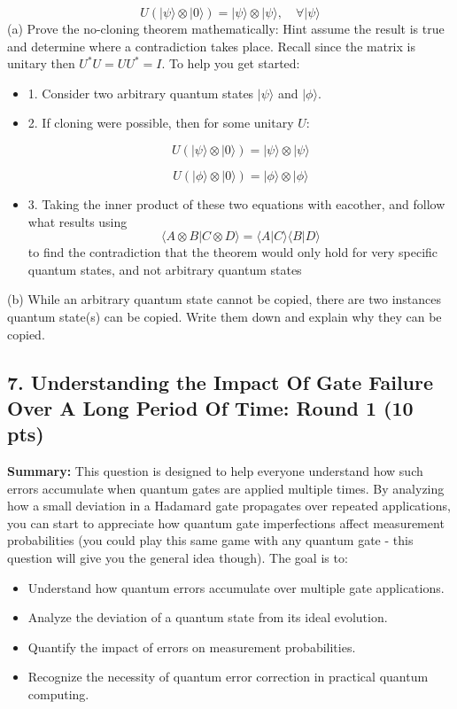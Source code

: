 \documentclass[12pt]{article}
\begin{document}
\[
U (|\psi\rangle \otimes |0\rangle) = |\psi\rangle \otimes |\psi\rangle, \quad \forall |\psi\rangle
\]
(a) Prove the no-cloning theorem mathematically: Hint assume the result is true and determine where a contradiction takes place. Recall since the matrix is unitary then $ U^*U=UU^*=I$. To help you get started:
\begin{itemize}
    \item 1. Consider two arbitrary quantum states \( |\psi\rangle \) and \( |\phi\rangle \).
\item 2. If cloning were possible, then for some unitary \( U \):

   \[
   U(|\psi\rangle \otimes |0\rangle) = |\psi\rangle \otimes |\psi\rangle
   \]

   \[
   U(|\phi\rangle \otimes |0\rangle) = |\phi\rangle \otimes |\phi\rangle
   \]

\item 3. Taking the inner product of these two equations with eacother, and follow what results using \[
\langle A \otimes B | C \otimes D \rangle = \langle A | C \rangle \langle B | D \rangle
\] to find the contradiction that the theorem would only hold for very specific quantum states, and not arbitrary quantum states
\end{itemize}

(b) While an arbitrary quantum state cannot be copied, there are two instances quantum state(s) can be copied. Write them down and explain why they can be copied.



\subsection*{7. Understanding the Impact Of Gate Failure Over A Long Period Of Time: Round 1 (10 pts)}

\textbf{Summary:} This question is designed to help everyone understand how such errors accumulate when quantum gates are applied multiple times. By analyzing how a small deviation in a Hadamard gate propagates over repeated applications, you can start to appreciate how quantum gate imperfections affect measurement probabilities (you could play this same game with any quantum gate - this question will give you the general idea though). The goal is to:

\begin{itemize}
    \item Understand how quantum errors accumulate over multiple gate applications.
    \item Analyze the deviation of a quantum state from its ideal evolution.
    \item Quantify the impact of errors on measurement probabilities.
    \item Recognize the necessity of quantum error correction in practical quantum computing.
\end{itemize}
\end{document}
